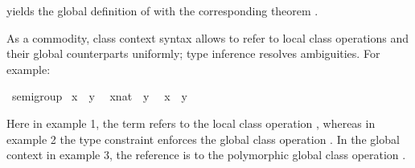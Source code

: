 \begin{isabellebody}
\begin{isamarkuptext}
\noindent yields the global definition of
  with the corresponding theorem .%
\end{isamarkuptext}%
\isamarkuptrue%
%
\isamarkuptrue%
%
\begin{isamarkuptext}%
As a commodity, class context syntax allows to refer
  to local class operations and their global counterparts
  uniformly;  type inference resolves ambiguities.  For example:%
\end{isamarkuptext}%
\isamarkuptrue%
%
\isadelimquote
%
\endisadelimquote
%
\isatagquote
{}\isamarkupfalse%
\ semigroup\isanewline
{}\isanewline
\isanewline
{}\isamarkupfalse%
\ {\isachardoublequoteopen}x\ {\isasymotimes}\ y{\isachardoublequoteclose}\ %
\isanewline
{}\isamarkupfalse%
\ {\isachardoublequoteopen}{\isacharparenleft}x{\isasymColon}nat{\isacharparenright}\ {\isasymotimes}\ y{\isachardoublequoteclose}\ %
\isanewline
\isanewline
{}\isamarkupfalse%
\isanewline
\isanewline
{}\isamarkupfalse%
\ {\isachardoublequoteopen}x\ {\isasymotimes}\ y{\isachardoublequoteclose}\ %
%
\endisatagquote
{\isafoldquote}%
%
\isadelimquote
%
\endisadelimquote
%
\begin{isamarkuptext}%
\noindent Here in example 1, the term refers to the local class operation
  , whereas in example 2 the type constraint
  enforces the global class operation .
  In the global context in example 3, the reference is
  to the polymorphic global class operation .%
\end{isamarkuptext}%
\isamarkuptrue%
%
\end{isabellebody}

